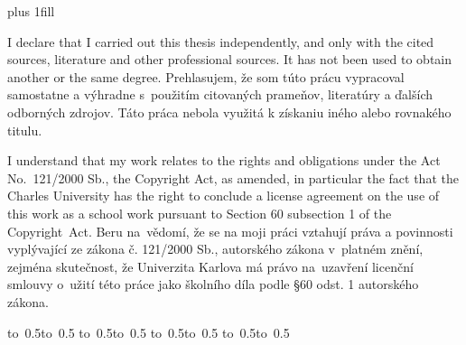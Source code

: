 \newpage

\hypersetup{pageanchor=true}
\pagestyle{plain}
\vglue 0pt plus 1fill

\ifEN
\noindent
I declare that I carried out this \ThesisAccusative thesis independently, and only with the cited
sources, literature and other professional sources. It has not been used to obtain another
or the same degree.
\else
\noindent
Prehlasujem, že som túto \ThesisAccusative prácu vypracoval samostatne a výhradne
s~použitím citovaných prameňov, literatúry a ďalších odborných zdrojov.
Táto práca nebola využitá k získaniu iného alebo rovnakého titulu.
\fi

\ifEN
\medskip\noindent
I understand that my work relates to the rights and obligations under the Act No.~121/2000 Sb.,
the Copyright Act, as amended, in particular the fact that the Charles
University has the right to conclude a license agreement on the use of this
work as a school work pursuant to Section 60 subsection 1 of the Copyright~Act.
\else
\medskip\noindent
Beru na~vědomí, že se na moji práci vztahují práva a povinnosti vyplývající
ze zákona č. 121/2000 Sb., autorského zákona v~platném znění, zejména skutečnost,
že Univerzita Karlova má právo na~uzavření licenční smlouvy o~užití této
práce jako školního díla podle §60 odst. 1 autorského zákona.
\fi

\vspace{10mm}


\ifEN
\hbox{\hbox to 0.5\hbox to 0.5\hsize{\dotfill\quad}}
\smallskip
\hbox{\hbox to 0.5\hsize{}\hbox to 0.5}
\else
\hbox{\hbox to 0.5\hbox to 0.5\hsize{\dotfill\quad}}
\smallskip
\hbox{\hbox to 0.5\hsize{}\hbox to 0.5}
\fi

\vspace{20mm}
\newpage



\noindent
\Dedication

\newpage



